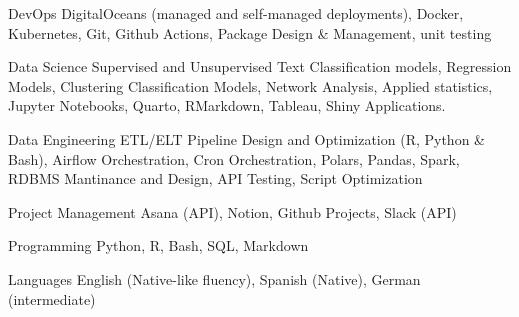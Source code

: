 

\begin{cvskills}

  \cvskill
    {DevOps} %
    {DigitalOceans (managed and self-managed deployments), Docker, Kubernetes, Git, Github Actions, Package Design \& Management, unit testing} %

  \cvskill
    {Data Science} %
    {Supervised and Unsupervised Text Classification models, Regression Models, Clustering Classification Models, Network Analysis, Applied statistics, Jupyter Notebooks, Quarto, RMarkdown, Tableau, Shiny Applications.} %

  \cvskill
    {Data Engineering} %
    {ETL/ELT Pipeline Design and Optimization (R, Python \& Bash), Airflow Orchestration, Cron Orchestration, Polars, Pandas, Spark, RDBMS Mantinance and Design, API Testing, Script Optimization} %

  \cvskill
    {Project Management} %
    {Asana (API), Notion, Github Projects, Slack (API)} %

  \cvskill
    {Programming} %
    {Python, R, Bash, SQL, Markdown} %

  \cvskill
    {Languages} %
    {English (Native-like fluency), Spanish (Native), German (intermediate)} %

\end{cvskills}

